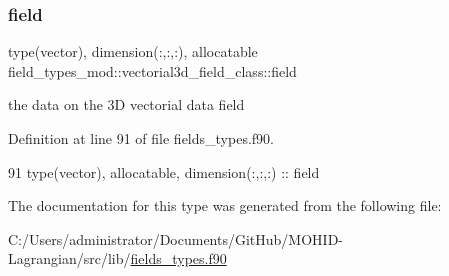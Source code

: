 \subsubsection{\texorpdfstring{field}{field}}
{\footnotesize\ttfamily type(vector), dimension(\+:,\+:,\+:), allocatable field\+\_\+types\+\_\+mod\+::vectorial3d\+\_\+field\+\_\+class\+::field\hspace{0.3cm}{\ttfamily [private]}}



the data on the 3D vectorial data field 



Definition at line 91 of file fields\+\_\+types.\+f90.


\begin{DoxyCode}
91         \textcolor{keywordtype}{type}(vector), \textcolor{keywordtype}{allocatable}, \textcolor{keywordtype}{dimension(:,:,:)} :: field
\end{DoxyCode}


The documentation for this type was generated from the following file\+:\begin{DoxyCompactItemize}
\item 
C\+:/\+Users/administrator/\+Documents/\+Git\+Hub/\+M\+O\+H\+I\+D-\/\+Lagrangian/src/lib/\mbox{\hyperlink{fields__types_8f90}{fields\+\_\+types.\+f90}}\end{DoxyCompactItemize}
